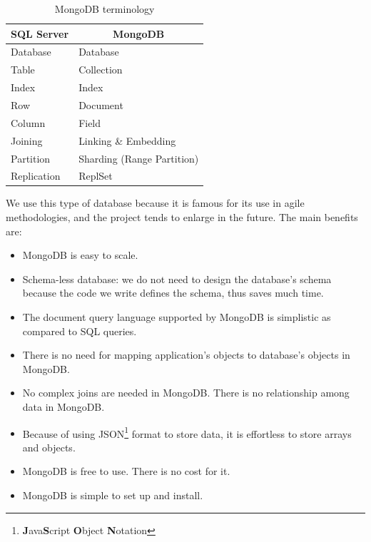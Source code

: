 \begin{table}[H]
	\centering
    \begin{tabular}{|l|l|}
        \hline
        \multicolumn{1}{c}{\bfseries SQL Server} & \multicolumn{1}{c}{\bfseries MongoDB} \\ \hline
        \multicolumn{1}{|l|}{Database}  & \multicolumn{1}{l|}{Database} \\ \hline
        \multicolumn{1}{|l|}{Table}  & \multicolumn{1}{l|}{Collection} \\ \hline
        \multicolumn{1}{|l|}{Index}  & \multicolumn{1}{l|}{Index} \\ \hline
        \multicolumn{1}{|l|}{Row}  & \multicolumn{1}{l|}{Document} \\ \hline
        \multicolumn{1}{|l|}{Column}  & \multicolumn{1}{l|}{Field} \\ \hline
        \multicolumn{1}{|l|}{Joining}  & \multicolumn{1}{l|}{Linking \& Embedding} \\ \hline
        \multicolumn{1}{|l|}{Partition}  & \multicolumn{1}{l|}{Sharding (Range Partition)} \\ \hline
        \multicolumn{1}{|l|}{Replication}  & \multicolumn{1}{l|}{ReplSet} \\ \hline
    \end{tabular}
	\caption{MongoDB terminology}
	\label{tab:mongoDB_terminology}
\end{table}

We use this type of database because it is famous for its use in agile methodologies, and the project tends to enlarge in the future. The main benefits are:
\begin{itemize}
	\item MongoDB is easy to scale.
	\item Schema-less database: we do not need to design the database's schema because the code we write defines the schema, thus saves much time.
	\item The document query language supported by MongoDB is simplistic as compared to SQL queries.
	\item There is no need for mapping application's objects to database's objects in MongoDB.
	\item No complex joins are needed in MongoDB. There is no relationship among data in MongoDB.
	\item Because of using JSON\footnote{\textbf{J}ava\textbf{S}cript \textbf{O}bject \textbf{N}otation} format to store data, it is effortless to store arrays and objects.
	\item MongoDB is free to use. There is no cost for it.
	\item MongoDB is simple to set up and install.
\end{itemize}

